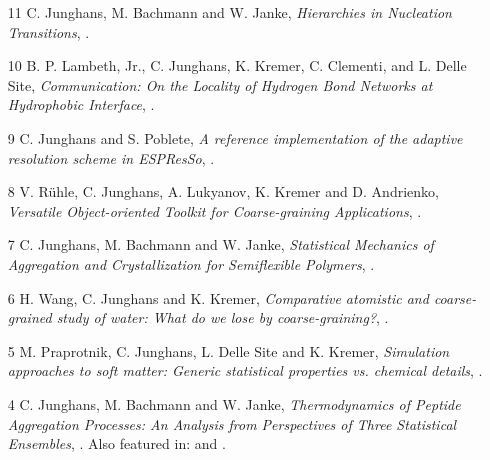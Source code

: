 \documentclass{article}
\begin{document}
\begin{enumerate}
\item[11] C. Junghans, M. Bachmann and W. Janke,
  \textit{Hierarchies in Nucleation Transitions},
  .

\item[10] B. P. Lambeth, Jr., C. Junghans, K. Kremer, C. Clementi, and L. Delle Site, 
  \textit{Communication: On the Locality of Hydrogen Bond Networks at Hydrophobic Interface},
  .

\item[9] C. Junghans and S. Poblete,
  \textit{A reference implementation of the adaptive resolution scheme in ESPResSo},
  .

\item[8] V. R{\"u}hle, C. Junghans, A. Lukyanov, K. Kremer and D. Andrienko,
  \textit{Versatile Object-oriented Toolkit for Coarse-graining Applications},
  . 

\item[7] C. Junghans, M. Bachmann and W. Janke,
  \textit{Statistical Mechanics of Aggregation and Crystallization for Semiflexible Polymers},
  .

\item[6] H. Wang, C. Junghans and K. Kremer,
  \textit{Comparative atomistic and coarse-grained study of water: What do we lose by coarse-graining?},
  .

\item[5] M. Praprotnik, C. Junghans, L. Delle Site and K. Kremer,
  \textit{Simulation approaches to soft matter: Generic statistical properties vs. chemical details},
  .

\item[4] C. Junghans, M. Bachmann and W. Janke,
  \textit{Thermodynamics of Peptide Aggregation Processes: An Analysis from Perspectives of Three Statistical Ensembles},
   .
  Also featured in:  and .


\end{enumerate}
\end{document}
